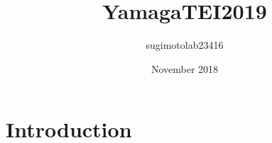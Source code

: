 \documentclass{article}
\title{YamagaTEI2019}
\author{sugimotolab23416 }
\date{November 2018}
\begin{document}
\maketitle

\section{Introduction}
\end{document}
